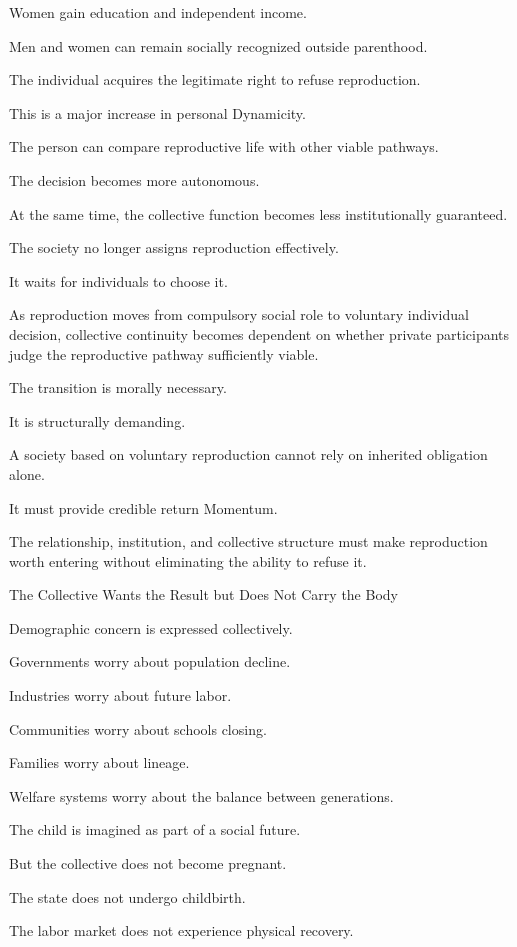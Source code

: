 Women gain education and independent income.

Men and women can remain socially recognized outside parenthood.

The individual acquires the legitimate right to refuse reproduction.

This is a major increase in personal Dynamicity.

The person can compare reproductive life with other viable pathways.

The decision becomes more autonomous.

At the same time, the collective function becomes less institutionally guaranteed.

The society no longer assigns reproduction effectively.

It waits for individuals to choose it.

As reproduction moves from compulsory social role to voluntary individual decision, collective continuity becomes dependent on whether private participants judge the reproductive pathway sufficiently viable.

The transition is morally necessary.

It is structurally demanding.

A society based on voluntary reproduction cannot rely on inherited obligation alone.

It must provide credible return Momentum.

The relationship, institution, and collective structure must make reproduction worth entering without eliminating the ability to refuse it.

The Collective Wants the Result but Does Not Carry the Body

Demographic concern is expressed collectively.

Governments worry about population decline.

Industries worry about future labor.

Communities worry about schools closing.

Families worry about lineage.

Welfare systems worry about the balance between generations.

The child is imagined as part of a social future.

But the collective does not become pregnant.

The state does not undergo childbirth.

The labor market does not experience physical recovery.

